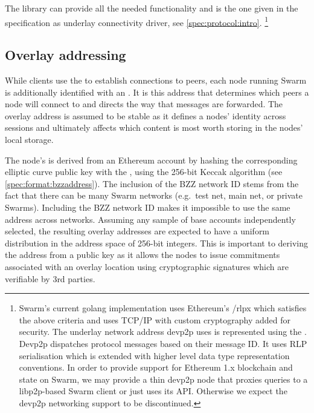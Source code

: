 The  library can provide all the needed functionality and is the one given in the specification as underlay connectivity driver, see \ref{spec:protocol:intro}.%
%
\footnote{Swarm's current golang implementation uses Ethereum's /rlpx which satisfies the above criteria and uses TCP/IP with custom cryptography added for security. The underlay network address devp2p uses is represented using the . Devp2p dispatches protocol messages based on their message ID. It uses RLP serialisation which is extended with higher level data type representation conventions. In order to provide support for Ethereum 1.x blockchain and state on Swarm, we may provide a thin devp2p node that proxies queries to a libp2p-based Swarm client or just uses its API. Otherwise we expect the devp2p networking support to be discontinued.}

\subsection{Overlay addressing\statusgreen}\label{sec:overlay-addressing} 
\green{}

While clients use the  to establish connections to peers, each node running Swarm is additionally identified with an . It is this address that determines which peers a node will connect to and directs the way that messages are forwarded. The overlay address is assumed to be stable as it defines a nodes' identity across sessions and ultimately affects which content is most worth storing in the nodes' local storage.

The node's  is derived from an Ethereum account by hashing the corresponding elliptic curve public key with the , using the 256-bit Keccak algorithm (see \ref{spec:format:bzzaddress}). The inclusion of the BZZ network ID stems from the fact that there can be many Swarm networks (e.g.\ test net, main net, or private Swarms). Including the BZZ network ID makes it impossible to use the same address across networks. Assuming any sample of base accounts independently selected, the resulting overlay addresses are expected to have a uniform distribution in the address space of 256-bit integers. This is important to deriving the address from a public key as it allows the nodes to issue commitments associated with an overlay location using cryptographic signatures which are verifiable by 3rd parties. 

